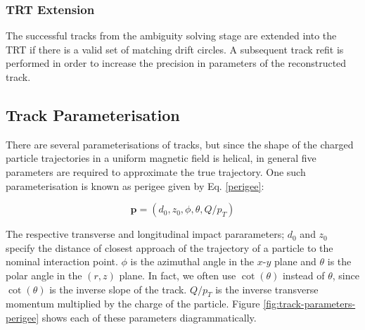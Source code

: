 \subsubsection{TRT Extension}

The successful tracks from the ambiguity solving stage are extended into the TRT if there is a valid set of matching drift circles. A subsequent track refit is performed in order to increase the precision in parameters of the reconstructed track.



\subsection{Track Parameterisation}
\label{track-parameterisation}

There are several parameterisations of tracks, but since the shape of the charged particle trajectories in a uniform magnetic field is helical, in general five parameters are required to approximate the true trajectory. One such parameterisation is known as perigee given by Eq. \ref{perigee}:

\begin{equation}\label{perigee}
\textbf{p} = (d_0, z_0, \phi, \theta, Q/p_T)
\end{equation}

The respective transverse and longitudinal impact pararameters; $d_0$ and $z_0$ specify the distance of closest approach of the trajectory of a particle to the nominal interaction point. $\phi$ is the azimuthal angle in the $x$-$y$ plane and $\theta$ is the polar angle in the $(r,z)$ plane. In fact, we often use $\cot(\theta)$ instead of $\theta$, since $\cot(\theta)$ is the inverse slope of the track. $Q/p_T$ is the inverse transverse momentum multiplied by the charge of the particle. Figure \ref{fig:track-parameters-perigee} shows each of these parameters diagrammatically.


